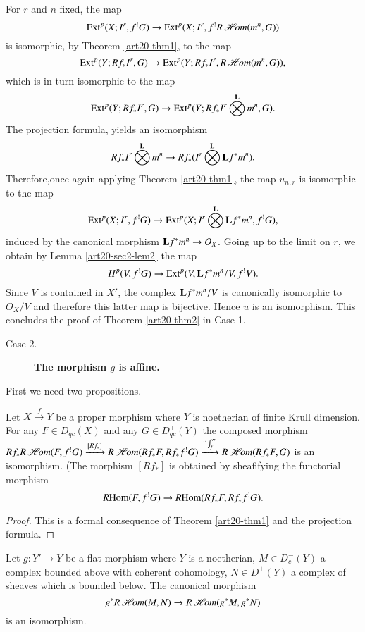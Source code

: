 For $r$ and $n$ fixed, the map
$$
\operatorname{\mathrm{Ext}}^{p}(X;I^{r},f^{!}G)\to \operatorname{\mathrm{Ext}}^{p}(X;I^{r},f^{!}R\operatorname{\mathscr{H}\!\textit{om}}(m^{n},G))
$$
is isomorphic, by Theorem \ref{art20-thm1}, to the map 
$$
\operatorname{\mathrm{Ext}}^{p}(Y;Rf_{*}I^{r},G)\to \operatorname{\mathrm{Ext}}^{p}(Y;Rf_{*}I^{r},R\operatorname{\mathscr{H}\!\textit{om}}(m^{n},G)),
$$
which is in turn isomorphic to the map
$$
\operatorname{\mathrm{Ext}}^{p}(Y;Rf_{*}I^{r},G)\to \operatorname{\mathrm{Ext}}^{p}(Y;Rf_{*}I^{r}\bigotimes\limits^{\mathbf{L}}m^{n},G).
$$
The projection formula, yields an isomorphism
$$
Rf_{*}I^{r}\bigotimes\limits^{\mathbf{L}}m^{n}\to Rf_{*}(I^{r}\bigotimes\limits^{\mathbf{L}}\mathbf{L} f^{*}m^{n}).
$$
Therefore,\pageoriginale once again applying Theorem \ref{art20-thm1}, the map $u_{n,r}$ is isomorphic to the map
$$
\operatorname{\mathrm{Ext}}^{p}(X;I^{r},f^{!}G)\to \operatorname{\mathrm{Ext}}^{p}(X;I^{r}\bigotimes\limits^{\mathbf{L}}\mathbf{L} f^{*}m^{n},f^{!}G),
$$
induced by the canonical morphism $\mathbf{L} f^{*}m^{n}\to O_{X}$. Going up to the limit on $r$, we obtain by Lemma \ref{art20-sec2-lem2} the map
$$
H^{p}(V,f^{!}G)\to \operatorname{\mathrm{Ext}}^{p}(V,\mathbf{L} f^{*}m^{n}/V,f^{!}V).
$$
Since $V$ is contained in $X'$, the complex $\mathbf{L} f^{*}m^{n}/V$ is canonically isomorphic to $O_{X}/V$ and therefore this latter map is bijective. Hence $u$ is an isomorphism. This concludes the proof of Theorem \ref{art20-thm2} in Case 1.
\begin{description}
\item[Case 2.] {\bf The morphism \boldmath$g$ is affine.}
\end{description}

First we need two propositions.

\begin{proposition}\label{art20-sec2-prop3}
Let $X\xrightarrow{f}Y$ be a proper morphism where $Y$ is noetherian of finite Krull dimension. For any $F\in D^{-}_{qc}(X)$ and any $G\in D^{+}_{qc}(Y)$ the composed morphism $Rf_{*}R\operatorname{\mathscr{H}\!\textit{om}}(F,f^{!}G)\xrightarrow{[Rf_{*}]}R\operatorname{\mathscr{H}\!\textit{om}} (Rf_{*}F, Rf_{*}f^{!}G)\xrightarrow{``\int_{f}''}R\operatorname{\mathscr{H}\!\textit{om}}(Rf_{*}F,G)$ is an isomorphism. (The morphism $[Rf_{*}]$ is obtained by sheafifying the functorial morphism
$$
\operatorname{\textit{R}\mathrm{Hom}} (F,f^{!}G)\to \operatorname{\textit{R}\mathrm{Hom}}(Rf_{*}F,Rf_{*}f^{!}G).
$$
\end{proposition}

\begin{proof}
This is a formal consequence of Theorem \ref{art20-thm1} and the projection formula.
\end{proof}

\begin{proposition}\label{art20-sec2-prop4}
Let $g:Y'\to Y$ be a flat morphism where $Y$ is a noetherian, $M\in D^{-}_{c}(Y)$ a complex bounded above with coherent cohomology, $N\in D^{+}(Y)$ a complex of sheaves which is bounded below. The canonical morphism
$$
g^{*}R\operatorname{\mathscr{H}\!\textit{om}}(M,N)\to R\operatorname{\mathscr{H}\!\textit{om}}(g^{*}M,g^{*}N)
$$
is an isomorphism.
\end{proposition}

